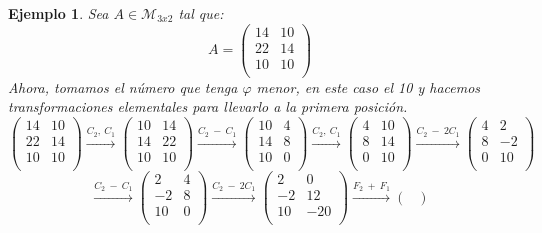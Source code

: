 \documentclass[11pt, a4paper, titlepage]{article}
\theoremstyle{theorem-style}
\theoremstyle{definition-style}
\theoremstyle{remark-style}
\theoremstyle{example-style}
\newtheorem*{ejemplo}{Ejemplo}
\begin{document}
\begin{ejemplo}
	Sea $A \in \mathcal{M}_{3x2}$ tal que:
	\[
	A = 
	\begin{pmatrix}
 14 & 10 \\
 22 & 14\\
 10 & 10\\ 
\end{pmatrix} 
	\]
	Ahora, tomamos el número que tenga $\varphi$ menor, en este caso el 10 y hacemos transformaciones elementales para llevarlo a la primera posición.
	\[\begin{pmatrix}
 14 & 10 \\
 22 & 14\\
 10 & 10\\ 
\end{pmatrix} \xrightarrow{C_2,\ C_1}
	\begin{pmatrix}
 10 & 14 \\
 14 & 22\\
 10 & 10\\ 
\end{pmatrix} \xrightarrow{C_2\ -\ C_1} \begin{pmatrix}
 10 & 4 \\
 14 & 8\\
 10 & 0\\ 
\end{pmatrix}\xrightarrow{C_2,\ C_1}
\begin{pmatrix}
 4 & 10 \\
 8 & 14\\
 0 & 10\\ 
\end{pmatrix}\xrightarrow{C_2\ -\ 2C_1}  \begin{pmatrix}
 4 & 2 \\
 8 & -2\\
 0 & 10\\ 
\end{pmatrix}
	\]
	\[
	\xrightarrow{C_2\ -\ C_1}
	\begin{pmatrix}
 2 & 4 \\
 -2 & 8\\
 10 & 0\\ 
\end{pmatrix} \xrightarrow{C_2\ -\ 2C_1}
\begin{pmatrix}
 2 & 0 \\
 -2 & 12\\
 10 & -20\\ 
\end{pmatrix}\xrightarrow{F_2\ +\ F_1}
\begin{pmatrix}

\end{pmatrix}\]
\end{ejemplo}
\end{document}
